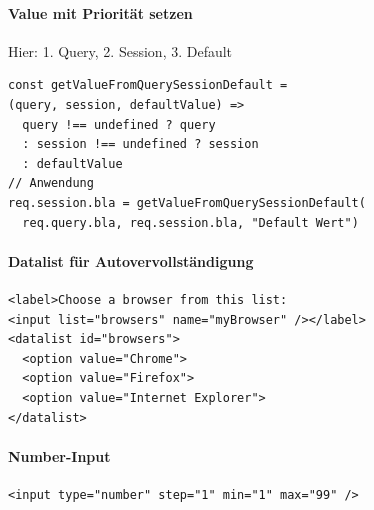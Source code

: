\documentclass[a4paper, fontsize=6pt]{scrartcl}
\begin{document}
\begin{multicols*}{5}

\paragraph{Value mit Priorität setzen} Hier: 1. Query, 2. Session, 3. Default 
\begin{verbatim}
const getValueFromQuerySessionDefault = 
(query, session, defaultValue) =>
  query !== undefined ? query
  : session !== undefined ? session
  : defaultValue
// Anwendung
req.session.bla = getValueFromQuerySessionDefault(
  req.query.bla, req.session.bla, "Default Wert")
\end{verbatim}

\paragraph{Datalist für Autovervollständigung}
\begin{verbatim}
<label>Choose a browser from this list:
<input list="browsers" name="myBrowser" /></label>
<datalist id="browsers">
  <option value="Chrome">
  <option value="Firefox">
  <option value="Internet Explorer">
</datalist>
\end{verbatim}

\paragraph{Number-Input}
\begin{verbatim}
<input type="number" step="1" min="1" max="99" />
\end{verbatim}


\end{multicols*}
\end{document}
